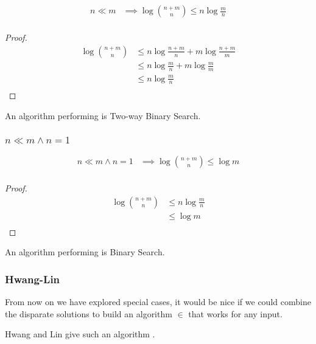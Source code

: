 \begin{lemma}
\begin{align*}
n \ll m &\implies \log\binom{n+m}{n} \leq n \log\frac{m}{n}\\
\end{align*}
\end{lemma}

\begin{proof}
\begin{align*}
\log\binom{n+m}{n} &\leq n \log\frac{n+m}{n} + m \log\frac{n+m}{m}\\
&\leq n \log\frac{m}{n} + m \log\frac{m}{m}\\
&\leq n \log\frac{m}{n}\\
\end{align*}
\end{proof}

An algorithm performing  is Two-way Binary Search.


\subsubsection{$n \ll m \land n = 1$}

\begin{lemma}
\begin{align*}
n \ll m \land n = 1 &\implies \log\binom{n+m}{n} \leq \log m\\
\end{align*}
\end{lemma}

\begin{proof}
\begin{align*}
\log\binom{n+m}{n} &\leq n \log\frac{m}{n}\\
&\leq \log m\\
\end{align*}
\end{proof}

An algorithm performing  is Binary Search.

\subsubsection{Hwang-Lin}

From now on we have explored special cases, it would be nice if we could combine the disparate solutions to build an algorithm $\in$  that works for any input.

Hwang and Lin give such an algorithm \cite{DBLP:journals/siamcomp/HwangL72}.